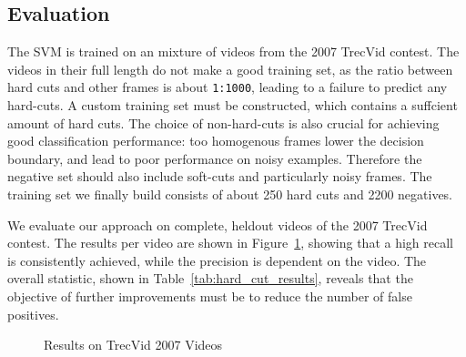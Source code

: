 \FloatBarrier
\subsection{Evaluation}
\label{sec:hard_cut_evaluation}




The SVM is trained on an mixture of videos from the 2007 TrecVid contest.
The videos in their full length do not make a good training set, as the ratio between hard cuts and other frames is about \texttt{1:1000}, leading to a failure to predict any hard-cuts.
A custom training set must be constructed, which contains a suffcient amount of hard cuts.
The choice of non-hard-cuts is also crucial for achieving good classification performance: too homogenous frames lower the decision boundary, and lead to poor performance on noisy examples.
Therefore the negative set should also include soft-cuts and particularly noisy frames.
The training set we finally build consists of about 250 hard cuts and 2200 negatives.


We evaluate our approach on complete, heldout videos of the 2007 TrecVid contest. The results per video are shown in Figure~\ref{fig:scatterplothceval}, showing that a high recall is consistently achieved, while the precision is dependent on the video. The overall statistic, shown in Table~\ref{tab:hard_cut_results}, reveals that the objective of further improvements must be to reduce the number of false positives.

\begin{figure}
\centering
{}
\caption{Results on TrecVid 2007 Videos}
\label{fig:scatterplothceval}
\end{figure}

